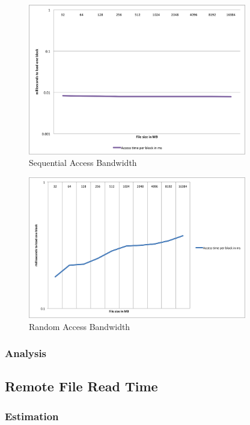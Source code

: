 \begin{figure}
 \centering
  \includegraphics[width=0.85\textwidth]{image/sequential_read.png}
  \caption{Sequential Access Bandwidth}
 \label{fig:sequential}
\end{figure}

\begin{figure}
 \centering
  \includegraphics[width=0.85\textwidth]{image/random_read.png}
  \caption{Random Access Bandwidth}
 \label{fig:random}
\end{figure}

\subsubsection{Analysis}

\subsection{Remote File Read Time}

\subsubsection{Estimation}

